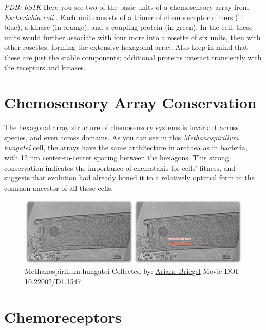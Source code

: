 \documentclass[]{tufte-book}
\begin{document}
\emph{PDB: 6S1K} Here you see two of the basic units of a chemosensory
array from \emph{Escherichia coli} \citep{cassidy2020}. Each unit
consists of a trimer of chemoreceptor dimers (in blue), a kinase (in
orange), and a coupling protein (in green). In the cell, these units
would further associate with four more into a rosette of six units, then
with other rosettes, forming the extensive hexagonal array. Also keep in
mind that these are just the stable components; additional proteins
interact transiently with the receptors and kinases.

\section{Chemosensory Array
Conservation}\label{chemosensory-array-conservation}

The hexagonal array structure of chemosensory systems is invariant
across species, and even across domains. As you can see in this
\emph{Methanospirillum hungatei} cell, the arrays have the same
architecture in archaea as in bacteria, with 12 nm center-to-center
spacing between the hexagons. This strong conservation indicates the
importance of chemotaxis for cells' fitness, and suggests that evolution
had already honed it to a relatively optimal form in the common ancestor
of all these cells.





\begin{figure}
\includegraphics{movie_stills/7_3} \caption[Methanospirillum hungatei Collected by:
\protect\hyperlink{ariane_briegel}{Ariane Briegel} Movie DOI:
\href{https://doi.org/10.22002/D1.1547}{10.22002/D1.1547}]{Methanospirillum hungatei Collected by:
\protect\hyperlink{ariane_briegel}{Ariane Briegel} Movie DOI:
\href{https://doi.org/10.22002/D1.1547}{10.22002/D1.1547}}\label{fig:7-3}
\end{figure}

\section{Chemoreceptors}\label{chemoreceptors}
\end{document}
